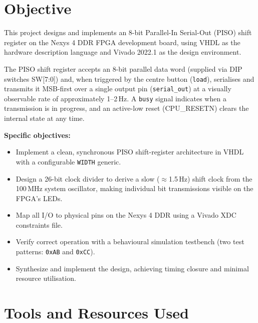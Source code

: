 \documentclass[12pt,a4paper]{report}
\begin{document}
\tableofcontents
\listoffigures
\listoftables
\newpage

\chapter{Objective}

This project designs and implements an 8-bit Parallel-In Serial-Out (PISO) shift register on the Nexys 4 DDR FPGA development board, using VHDL as the hardware description language and Vivado 2022.1 as the design environment.

The PISO shift register accepts an 8-bit parallel data word (supplied via DIP switches SW[7:0]) and, when triggered by the centre button (\texttt{load}), serialises and transmits it MSB-first over a single output pin (\texttt{serial\_out}) at a visually observable rate of approximately 1--2\,Hz. A \texttt{busy} signal indicates when a transmission is in progress, and an active-low reset (CPU\_RESETN) clears the internal state at any time.

\textbf{Specific objectives:}
\begin{itemize}[leftmargin=1.5em]
  \item Implement a clean, synchronous PISO shift-register architecture in VHDL with a configurable \texttt{WIDTH} generic.
  \item Design a 26-bit clock divider to derive a slow ($\approx$1.5\,Hz) shift clock from the 100\,MHz system oscillator, making individual bit transmissions visible on the FPGA's LEDs.
  \item Map all I/O to physical pins on the Nexys 4 DDR using a Vivado XDC constraints file.
  \item Verify correct operation with a behavioural simulation testbench (two test patterns: \texttt{0xAB} and \texttt{0xCC}).
  \item Synthesize and implement the design, achieving timing closure and minimal resource utilisation.
\end{itemize}

\chapter{Tools and Resources Used}
\end{document}

